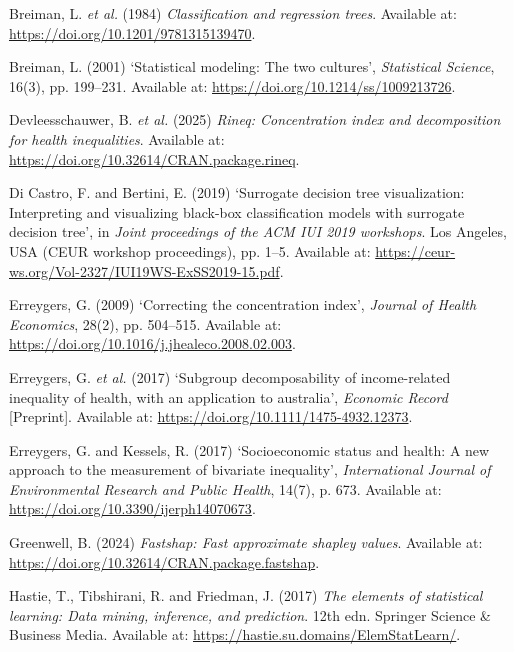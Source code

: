 \documentclass[
  11pt,
  a4paper,
]{article}
\newlength{\cslhangindent}
\newenvironment{CSLReferences}[2] %
 {\begin{list}{}{%
  \setlength{\itemindent}{0pt}
  \setlength{\leftmargin}{0pt}
  \setlength{\parsep}{0pt}
  \ifodd #1
   \setlength{\leftmargin}{\cslhangindent}
   \setlength{\itemindent}{-1\cslhangindent}
  \fi
  \setlength{\itemsep}{#2\baselineskip}}}
 {\end{list}}
\begin{document}
\protect{}\label{refs}
\begin{CSLReferences}{0}{1}
Breiman, L. \emph{et al.} (1984) \emph{Classification and regression
trees}. Available at: \url{https://doi.org/10.1201/9781315139470}.

Breiman, L. (2001) {`Statistical modeling: The two cultures'},
\emph{Statistical Science}, 16(3), pp. 199--231. Available at:
\url{https://doi.org/10.1214/ss/1009213726}.

Devleesschauwer, B. \emph{et al.} (2025) \emph{Rineq: Concentration
index and decomposition for health inequalities}. Available at:
\url{https://doi.org/10.32614/CRAN.package.rineq}.

Di Castro, F. and Bertini, E. (2019) {`Surrogate decision tree
visualization: Interpreting and visualizing black-box classification
models with surrogate decision tree'}, in \emph{Joint proceedings of the
ACM IUI 2019 workshops}. Los Angeles, USA (CEUR workshop proceedings),
pp. 1--5. Available at:
\url{https://ceur-ws.org/Vol-2327/IUI19WS-ExSS2019-15.pdf}.

Erreygers, G. (2009) {`Correcting the concentration index'},
\emph{Journal of Health Economics}, 28(2), pp. 504--515. Available at:
\url{https://doi.org/10.1016/j.jhealeco.2008.02.003}.

Erreygers, G. \emph{et al.} (2017) {`Subgroup decomposability of
income-related inequality of health, with an application to australia'},
\emph{Economic Record} {[}Preprint{]}. Available at:
\url{https://doi.org/10.1111/1475-4932.12373}.

Erreygers, G. and Kessels, R. (2017) {`Socioeconomic status and health:
A new approach to the measurement of bivariate inequality'},
\emph{International Journal of Environmental Research and Public
Health}, 14(7), p. 673. Available at:
\url{https://doi.org/10.3390/ijerph14070673}.

Greenwell, B. (2024) \emph{Fastshap: Fast approximate shapley values}.
Available at: \url{https://doi.org/10.32614/CRAN.package.fastshap}.

Hastie, T., Tibshirani, R. and Friedman, J. (2017) \emph{The elements of
statistical learning: Data mining, inference, and prediction}. 12th edn.
Springer Science \& Business Media. Available at:
\url{https://hastie.su.domains/ElemStatLearn/}.


\end{CSLReferences}
\end{document}
